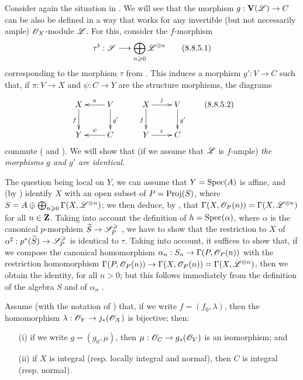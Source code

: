 \begin{env}[8.8.5]
Consider again the situation in .
We will see that the morphism $g:\bb{V}(\sh{L})\to C$ can be also be defined in a way that works for any invertible (but not necessarily ample) $\mathscr{O}_X$-module $\mathscr{L}$.
For this, consider the $f$-morphism
\[
\label{II.8.8.5.1}
  \tau^\flat:\sh{S}\to\bigoplus_{n\geq0}\sh{L}^{\otimes n}
  \tag{8.8.5.1}
\]
corresponding to the morphism $\tau$ from .
This induces  a morphism $g':V\to C$ such that, if $\pi:V\to X$ and $\psi:C\to Y$ are the structure morphisms, the diagrams
\[
\label{II.8.8.5.2}
  \xymatrix{
    X
      \ar[d]_{f}
  & V
      \ar[l]_{\pi}
      \ar[d]^{g'}
  \\Y
  & C
      \ar[l]_{\psi}
  }
  \qquad
  \xymatrix{
    X
      \ar[r]^{j}
      \ar[d]_{f}
  & V
      \ar[d]^{g'}
  \\Y
      \ar[r]^{\varepsilon}
  & C
  }
\tag{8.8.5.2}
\]
commute ( and ).
We will show that (if we assume that $\mathscr{L}$ is $f$-ample) \emph{the morphisms $g$ and $g'$ are identical}.

The question being local on $Y$, we can assume that $Y=\operatorname{Spec}(A)$ is affine, and (by ) identify $X$ with an open subset of $P=\operatorname{Proj}(S)$, where $S=A\oplus\bigoplus_{n\geqslant0}\Gamma(X,\mathscr{L}^{\otimes n})$;
we then deduce, by , that $\Gamma(X,\mathscr{O}_P(n))=\Gamma(X,\mathscr{L}^{\otimes n})$ for all $n\in\mathbf{Z}$.
Taking into account the definition of $h=\operatorname{Spec}(\alpha)$, where $\alpha$ is the canonical $p$-morphism $\widetilde{S}\to\sh{S}_P^\geq$ , we have to show that the restriction to $X$ of $\alpha^\sharp:p^*(\widetilde{S})\to\sh{S}_P^\geq$ is identical to $\tau$.
Taking  into account, it suffices to show that, if we compose the canonical homomorphism $\alpha_n:S_n\to\Gamma(P,\sh{O}_P(n))$ with the restriction homomorphism $\Gamma(P,\sh{O}_P(n))\to\Gamma(X,\sh{O}_P(n))=\Gamma(X,\sh{L}^{\otimes n})$, then we obtain the identity, for all $n>0$;
but this follows immediately from the definition of the algebra $S$ and of $\alpha_n$ .
\end{env}

\begin{proposition}[8.8.6]
\label{II.8.8.6}
Assume (with the notation of ) that, if we write $f=(f_0,\lambda)$, then the homomorphism $\lambda:\sh{O}_Y\to j_*(\sh{O}_X)$ is bijective;
then:
\begin{enumerate}
  \item[\rm{(i)}] if we write $g=(g_0,\mu)$, then $\mu:\sh{O}_C\to g_*(\sh{O}_V)$ is an isomorphism; and
  \item[\rm{(ii)}] if $X$ is integral (resp. locally integral and normal), then $C$ is integral (resp. normal).
\end{enumerate}
\end{proposition}

